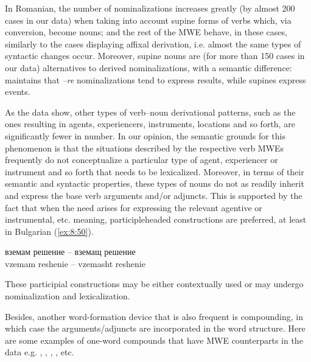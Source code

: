 \documentclass[output=paper]{langsci/langscibook}
\begin{document}
In Romanian, the
number of nominalizations increases greatly (by almost 200 cases in our
data) when taking into account supine forms of verbs which, via
conversion, become nouns; and the rest of the MWE behave, in these
cases, similarly to the cases displaying affixal derivation, i.e.
almost the same types of syntactic changes occur. Moreover, supine
nouns are (for more than 150 cases in our data) alternatives to derived
nominalizations, with a semantic difference: \cite{cornilescu2001}
maintains that \textit{–re} nominalizations tend to express results, while supines
express events.

As the data show, other types of verb–noun derivational patterns, such
as the ones resulting in agents, experiencers, instruments, locations
and so forth, are significantly fewer in number. In our opinion, the
semantic grounds for this phenomenon is that the situations described
by the respective verb MWEs frequently do not conceptualize a
particular type of agent, experiencer or instrument and so forth that
needs to be lexicalized. Moreover, in terms of their semantic and
syntactic properties, these types of nouns do not as readily inherit
and express the base verb arguments and/or adjuncts. This is supported
by the fact that when the need arises for expressing the relevant
agentive or instrumental, etc. meaning, participle\textendash headed constructions
are preferred, at least in Bulgarian (\ref{ex:8:50}).


\begin{exe}
\ex \label{ex:8:50}
\settowidth{}
\gll вземам решение -- вземащ решение\\
vzemam reshenie -- vzemasht reshenie\\ 
\end{exe}


These participial constructions may be either contextually used or may
undergo nominalization and lexicalization.



Besides, another word-formation device that is also frequent is
compounding, in which case the arguments/adjuncts are incorporated in
the word structure. Here are some examples of one-word compounds that
have MWE counterparts in the data e.g.\@ 
{}, 
, 
, 
, etc. 
\end{document}
